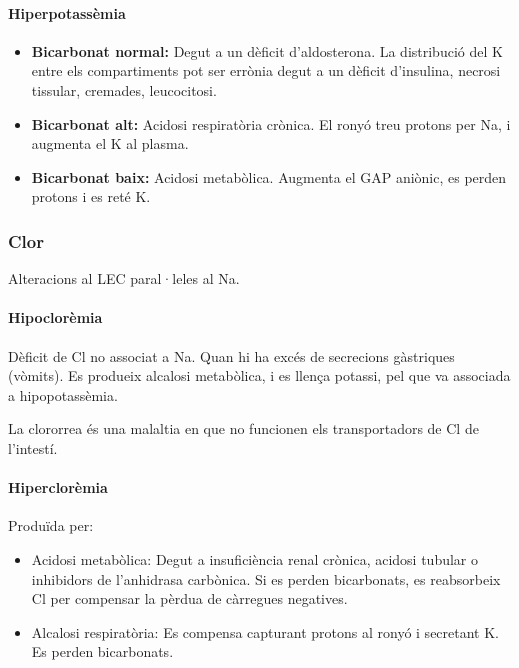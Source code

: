 \paragraph{Hiperpotassèmia}

\begin{itemize}
\item \textbf{Bicarbonat normal:} Degut a un dèficit d'aldosterona. La
  distribució del K entre els compartiments pot ser errònia degut a un
  dèficit d'insulina, necrosi tissular, cremades, leucocitosi.

\item \textbf{Bicarbonat alt:} Acidosi respiratòria crònica. El ronyó
  treu protons per Na, i augmenta el K al plasma.

\item \textbf{Bicarbonat baix:} Acidosi metabòlica. Augmenta el GAP
  aniònic, es perden protons i es reté K.
\end{itemize}

\subsubsection{Clor}
\label{sec:clor}

Alteracions al LEC paral·leles al Na.

\paragraph{Hipoclorèmia}
Dèficit de Cl no associat a Na. Quan hi ha excés de secrecions
gàstriques (vòmits). Es produeix alcalosi metabòlica, i es llença
potassi, pel que va associada a hipopotassèmia.

La clororrea és una malaltia en que no funcionen els transportadors de
Cl de l'intestí.

\paragraph{Hiperclorèmia}
Produïda per:
\begin{itemize}
\item Acidosi metabòlica: Degut a insuficiència renal crònica, acidosi
  tubular o inhibidors de l'anhidrasa carbònica. Si es perden
  bicarbonats, es reabsorbeix Cl per compensar la pèrdua de càrregues
  negatives.

\item Alcalosi respiratòria: Es compensa capturant protons al ronyó i
  secretant K. Es perden bicarbonats.
\end{itemize}

